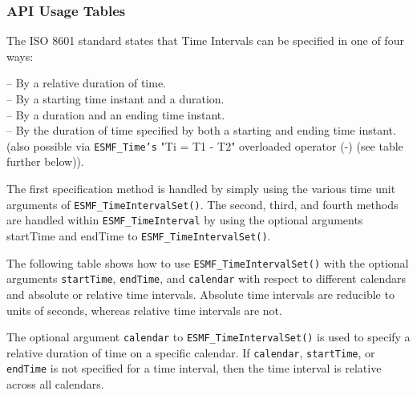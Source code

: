 
\subsubsection [API Usage Tables] {API Usage Tables}
\newpage

The ISO 8601 standard states that Time Intervals can be specified in one of four ways:

  -- By a relative duration of time. \\
  -- By a starting time instant and a duration. \\
  -- By a duration and an ending time instant. \\
  -- By the duration of time specified by both a starting and ending time instant. (also possible via {\tt ESMF\_Time's} "Ti = T1 - T2" overloaded operator (-) (see table further below)).

The first specification method is handled by simply using the various time unit arguments of {\tt ESMF\_TimeIntervalSet()}.  The second, third, and fourth methods are handled within {\tt ESMF\_TimeInterval} by using the optional arguments startTime and endTime to {\tt ESMF\_TimeIntervalSet()}.

The following table shows how to use {\tt ESMF\_TimeIntervalSet()} with the optional arguments {\tt startTime}, {\tt endTime}, and {\tt calendar} with respect to different calendars and absolute or relative time intervals.  Absolute time intervals are reducible to units of seconds, whereas relative time intervals are not.

The optional argument {\tt calendar} to {\tt ESMF\_TimeIntervalSet()} is used to specify a relative duration of time on a specific calendar.  If {\tt calendar}, {\tt startTime}, or {\tt endTime} is not specified for a time interval, then the time interval is relative across all calendars.

